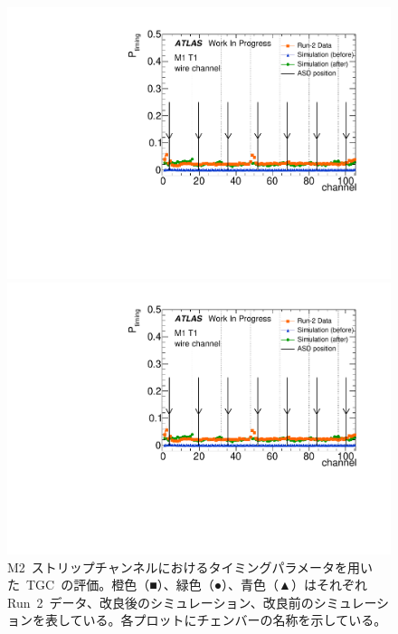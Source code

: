 \begin{figure}[htbp]
\begin{minipage}{0.49\hsize}
			\includegraphics[width=\textwidth,page=21]{img/pdf5/master_timingplot_comp.pdf}
			\end{minipage}
			\begin{minipage}{0.49\hsize}
			\centering
			\includegraphics[width=\textwidth,page=23]{img/pdf5/master_timingplot_comp.pdf}
			\end{minipage}
		\caption[M2~ストリップチャンネルにおけるタイミングパラメータを用いた~TGC~の評価。]{M2~ストリップチャンネルにおけるタイミングパラメータを用いた~TGC~の評価。橙色（■）、緑色（●）、青色（▲）はそれぞれRun~2~データ、改良後のシミュレーション、改良前のシミュレーションを表している。各プロットにチェンバーの名称を示している。}
		\label{fig:timingPlotCompStripM2}
	\end{figure}
	
